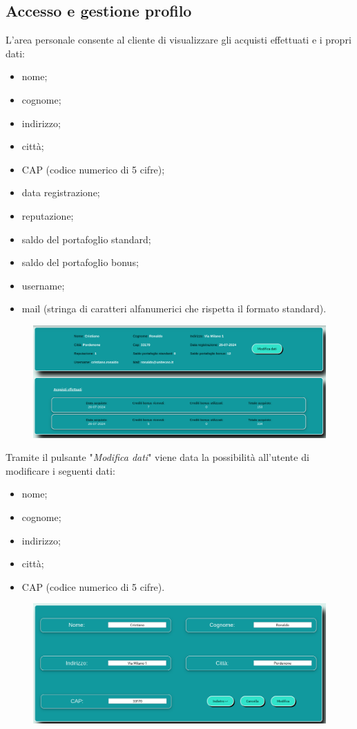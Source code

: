 \documentclass[a4paper, 14pt]{article}
\begin{document}
\begin{flushleft}
			\subsection{Accesso e gestione profilo}		
				L'area personale consente al cliente di visualizzare gli acquisti effettuati e i propri dati:
				\begin{itemize}
					\item nome;
					\item cognome;
					\item indirizzo;
					\item città;
					\item CAP (codice numerico di 5 cifre);
					\item data registrazione;
					\item reputazione;
					\item saldo del portafoglio standard;										
					\item saldo del portafoglio bonus;
					\item username;
					\item mail (stringa di caratteri alfanumerici che rispetta il formato standard).
				\end{itemize}
				\begin{figure}[H]
					\includegraphics[width=\textwidth, frame=2pt]{"screenAreaPersonale.png"}
				\end{figure}

				Tramite il pulsante "\textit{Modifica dati}" viene data la possibilità all'utente di modificare i seguenti dati:
				\begin{itemize}
					\item nome;
					\item cognome;
					\item indirizzo;
					\item città;
					\item CAP (codice numerico di 5 cifre).
				\end{itemize}
				\begin{figure}[H]
					\includegraphics[width=\textwidth, frame=2pt]{"screenModificaDati.png"}
				\end{figure}


\end{flushleft}
\end{document}
